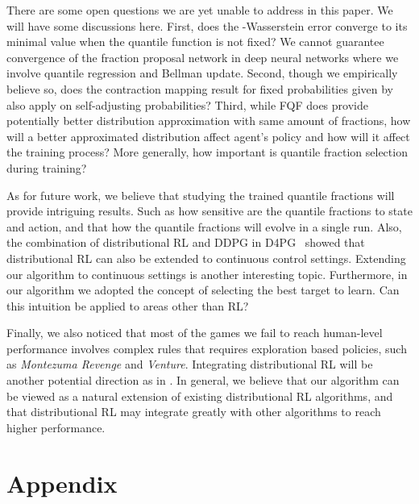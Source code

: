 \documentclass{article}
\begin{document}
There are some open questions we are yet unable to address in this paper. We will have some discussions here. First, does the -Wasserstein error converge to its minimal value when the quantile function is not fixed? We cannot guarantee convergence of the fraction proposal network in deep neural networks where we involve quantile regression and Bellman update. Second, though we empirically believe so, does the contraction mapping result for fixed probabilities given by \cite{dabney2018distributional} also apply on self-adjusting probabilities? Third, while FQF does provide potentially better distribution approximation with same amount of fractions, how will a better approximated distribution affect agent's policy and how will it affect the training process? More generally, how important is quantile fraction selection during training?

As for future work, we believe that studying the trained quantile fractions will provide intriguing results. Such as how sensitive are the quantile fractions to state and action, and that how the quantile fractions will evolve in a single run. Also, the combination of distributional RL and DDPG in D4PG~\citep{barth2018distributed} showed that distributional RL can also be extended to continuous control settings. Extending our algorithm to continuous settings is another interesting topic. Furthermore, in our algorithm we adopted the concept of selecting the best target to learn. Can this intuition be applied to areas other than RL?

Finally, we also noticed that most of the games we fail to reach human-level performance involves complex rules that requires exploration based policies, such as \textit{Montezuma Revenge} and \textit{Venture}. Integrating distributional RL will be another potential direction as in \citep{tang2018exploration}. In general, we believe that our algorithm can be viewed as a natural extension of existing distributional RL algorithms, and that distributional RL may integrate greatly with other algorithms to reach higher performance.



\newpage














\section*{Appendix}
\end{document}
